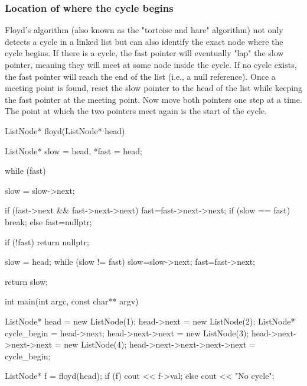 \documentclass{report}
\begin{document}
    \subsubsection{Location of where the cycle begins}
    \bigbreak \noindent 
    Floyd’s algorithm (also known as the "tortoise and hare" algorithm) not only detects a cycle in a linked list but can also identify the exact node where the cycle begins. 
    \bigbreak \noindent 
    If there is a cycle, the fast pointer will eventually "lap" the slow pointer, meaning they will meet at some node inside the cycle. If no cycle exists, the fast pointer will reach the end of the list (i.e., a null reference).
    \bigbreak \noindent 
    Once a meeting point is found, reset the slow pointer to the head of the list while keeping the fast pointer at the meeting point. Now move both pointers one step at a time. 
    \bigbreak \noindent 
    The point at which the two pointers meet again is the start of the cycle.
    \bigbreak \noindent 
    \begin{cppcode}
        ListNode* floyd(ListNode* head) {
            ListNode* slow = head, *fast = head;

            while (fast) {
                slow = slow->next;

                if (fast->next && fast->next->next) {
                    fast=fast->next->next;
                    if (slow == fast) break;
                }
                else fast=nullptr;

            } 
            if (!fast) return nullptr;

            slow = head;
            while (slow != fast) {
                slow=slow->next;
                fast=fast->next;
            }

            return slow;
        }

        int main(int argc, const char** argv) {

            ListNode* head = new ListNode(1);
            head->next = new ListNode(2);
            ListNode* cycle_begin = head->next;
            head->next->next = new ListNode(3);
            head->next->next->next = new ListNode(4);
            head->next->next->next->next = cycle_begin;

            ListNode* f = floyd(head);
            if (f) cout << f->val;
            else cout << "No cycle";
        }
    \end{cppcode}

    \bigbreak \noindent 
\end{document}
